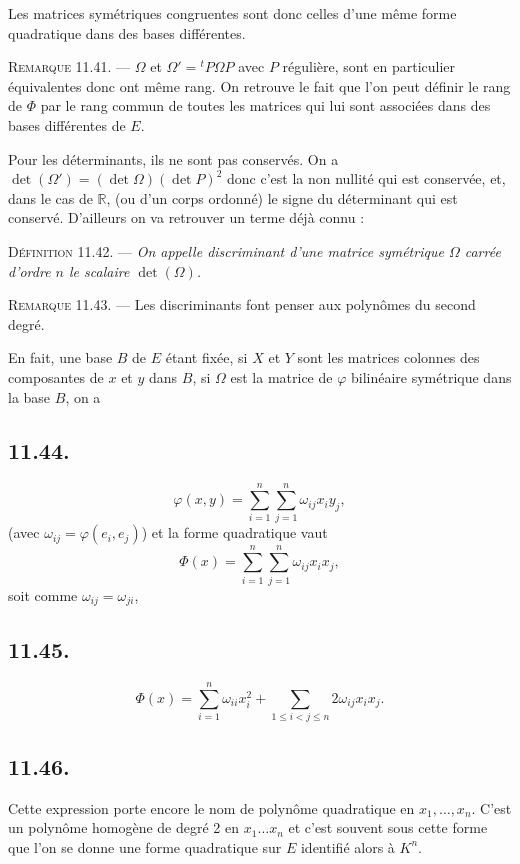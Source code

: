 Les matrices symétriques congruentes sont donc celles d'une même forme quadratique dans des bases différentes.

\medskip\noindent\textsc{Remarque 11.41.} --- $\Omega$ et $\Omega'={}^tP\Omega P$ avec $P$ régulière, sont en particulier équivalentes donc ont même rang. On retrouve le fait que l'on peut définir le rang de $\Phi$ par le rang commun de toutes les matrices qui lui sont associées dans des bases différentes de $E$.

Pour les déterminants, ils ne sont pas conservés. On a $\det(\Omega')=(\det\Omega)(\det P)^2$ donc c'est la non nullité qui est conservée, et, dans le cas de $\mathbb R$, (ou d'un corps ordonné) le signe du déterminant qui est conservé. D'ailleurs on va retrouver un terme déjà connu :

\medskip\noindent\textsc{Définition 11.42.} --- \emph{On appelle discriminant d'une matrice symétrique $\Omega$ carrée d'ordre $n$ le scalaire $\det(\Omega)$.}

\medskip\noindent\textsc{Remarque 11.43.} --- Les discriminants font penser aux polynômes du second degré.

En fait, une base $B$ de $E$ étant fixée, si $X$ et $Y$ sont les matrices colonnes des composantes de $x$ et $y$ dans $B$, si $\Omega$ est la matrice de $\varphi$ bilinéaire symétrique dans la base $B$, on a

\subsection*{11.44.}
\[
\varphi(x,y)=\sum_{i=1}^n\sum_{j=1}^n\omega_{ij}x_iy_j,
\]
(avec $\omega_{ij}=\varphi(e_i,e_j)$) et la forme quadratique vaut
\[
\Phi(x)=\sum_{i=1}^n\sum_{j=1}^n\omega_{ij}x_ix_j,
\]
soit comme $\omega_{ij}=\omega_{ji}$,

\subsection*{11.45.}
\[
\Phi(x)=\sum_{i=1}^n\omega_{ii}x_i^2+\sum_{1\le i<j\le n}2\omega_{ij}x_ix_j.
\]

\subsection*{11.46.}
Cette expression porte encore le nom de polynôme quadratique en $x_1,\ldots,x_n$. C'est un polynôme homogène de degré 2 en $x_1\ldots x_n$ et c'est souvent sous cette forme que l'on se donne une forme quadratique sur $E$ identifié alors à $K^n$.

